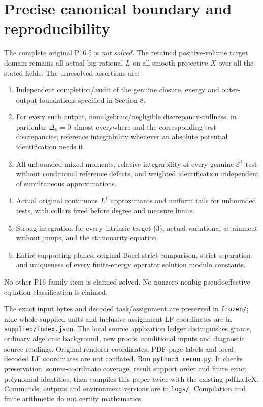 \documentclass[10pt]{article}
\newcommand{\E}{\mathcal E}
\begin{document}
\section{Precise canonical boundary and reproducibility}
The complete original P16.5 is \emph{not solved}. The retained
positive-volume target domain remains all actual big rational $L$ on
all smooth projective $X$ over all the stated fields.
The unresolved assertions are:
\begin{enumerate}
\item Independent completion/audit of the genuine closure, energy and
outer-output foundations specified in Section 8.
\item For every such output, nonalgebraic/negligible discrepancy-nullness,
in particular $\Delta_0=0$ almost everywhere and the corresponding
test discrepancies; reference integrability whenever an absolute
potential identification needs it.
\item All unbounded mixed moments, relative integrability of every
genuine $\E^1$ test without conditional reference defects, and
weighted identification independent of simultaneous approximations.
\item Actual original continuous $L^1$ approximants and uniform tails
for unbounded tests, with collars fixed before degree and measure limits.
\item Strong integration for every intrinsic target (3), actual
variational attainment without jumps, and the stationarity equation.
\item Entire supporting planes, original Borel strict comparison,
strict separation and uniqueness of every finite-energy operator
solution modulo constants.
\end{enumerate}
No other P16 family item is claimed solved. No nonzero nonbig
pseudoeffective equation classification is claimed.

The exact input bytes and decoded task/assignment are preserved in
\texttt{frozen/}; nine whole supplied units and inclusive assignment-LF
coordinates are in \texttt{supplied/index.json}. The local source
application ledger distinguishes grants, ordinary algebraic background,
new proofs, conditional inputs and diagnostic source readings.
Original renderer coordinates, PDF page labels and local decoded LF
coordinates are not conflated.
Run \texttt{python3 rerun.py}. It checks preservation, source-coordinate
coverage, result support order and finite exact polynomial identities,
then compiles this paper twice with the existing pdfLaTeX.
Commands, outputs and environment versions are in \texttt{logs/}.
Compilation and finite arithmetic do not certify mathematics.
\end{document}
